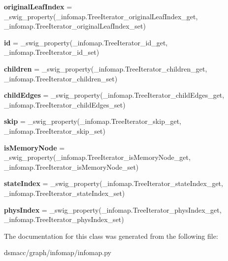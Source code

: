 \begin{DoxyCompactItemize}
{\bfseries original\+Leaf\+Index} = \+\_\+swig\+\_\+property(\+\_\+infomap.\+Tree\+Iterator\+\_\+original\+Leaf\+Index\+\_\+get, \+\_\+infomap.\+Tree\+Iterator\+\_\+original\+Leaf\+Index\+\_\+set)
\item 
\mbox{\label{classdsmacc_1_1graph_1_1infomap_1_1infomap_1_1TreeIterator_a610eeffb0391d9559c3130bd5e5a4322}} 
{\bfseries id} = \+\_\+swig\+\_\+property(\+\_\+infomap.\+Tree\+Iterator\+\_\+id\+\_\+get, \+\_\+infomap.\+Tree\+Iterator\+\_\+id\+\_\+set)
\item 
\mbox{\label{classdsmacc_1_1graph_1_1infomap_1_1infomap_1_1TreeIterator_a21f8f61aec9f659b949bdbbc8f403be3}} 
{\bfseries children} = \+\_\+swig\+\_\+property(\+\_\+infomap.\+Tree\+Iterator\+\_\+children\+\_\+get, \+\_\+infomap.\+Tree\+Iterator\+\_\+children\+\_\+set)
\item 
\mbox{\label{classdsmacc_1_1graph_1_1infomap_1_1infomap_1_1TreeIterator_a56c9d19756bc00b4500df5f5917a528b}} 
{\bfseries child\+Edges} = \+\_\+swig\+\_\+property(\+\_\+infomap.\+Tree\+Iterator\+\_\+child\+Edges\+\_\+get, \+\_\+infomap.\+Tree\+Iterator\+\_\+child\+Edges\+\_\+set)
\item 
\mbox{\label{classdsmacc_1_1graph_1_1infomap_1_1infomap_1_1TreeIterator_a2d8705c1196627e1026b2ff772fd2921}} 
{\bfseries skip} = \+\_\+swig\+\_\+property(\+\_\+infomap.\+Tree\+Iterator\+\_\+skip\+\_\+get, \+\_\+infomap.\+Tree\+Iterator\+\_\+skip\+\_\+set)
\item 
\mbox{\label{classdsmacc_1_1graph_1_1infomap_1_1infomap_1_1TreeIterator_a59184903da3588033a35b08e66b0b148}} 
{\bfseries is\+Memory\+Node} = \+\_\+swig\+\_\+property(\+\_\+infomap.\+Tree\+Iterator\+\_\+is\+Memory\+Node\+\_\+get, \+\_\+infomap.\+Tree\+Iterator\+\_\+is\+Memory\+Node\+\_\+set)
\item 
\mbox{\label{classdsmacc_1_1graph_1_1infomap_1_1infomap_1_1TreeIterator_ad01e004486ef61ab1199c0edc6666180}} 
{\bfseries state\+Index} = \+\_\+swig\+\_\+property(\+\_\+infomap.\+Tree\+Iterator\+\_\+state\+Index\+\_\+get, \+\_\+infomap.\+Tree\+Iterator\+\_\+state\+Index\+\_\+set)
\item 
\mbox{\label{classdsmacc_1_1graph_1_1infomap_1_1infomap_1_1TreeIterator_a53c64d6484e35affe9c6c5e6bcec58cc}} 
{\bfseries phys\+Index} = \+\_\+swig\+\_\+property(\+\_\+infomap.\+Tree\+Iterator\+\_\+phys\+Index\+\_\+get, \+\_\+infomap.\+Tree\+Iterator\+\_\+phys\+Index\+\_\+set)
\end{DoxyCompactItemize}


The documentation for this class was generated from the following file\+:\begin{DoxyCompactItemize}
\item 
dsmacc/graph/infomap/infomap.\+py\end{DoxyCompactItemize}
